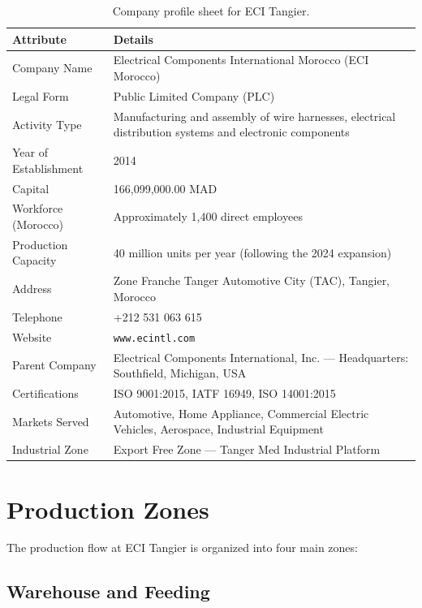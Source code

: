 \begin{table}[H]
  \centering
  \caption{Company profile sheet for ECI Tangier.}
  \label{tab:company-profile}
  \begin{tabular}{p{4cm} p{8cm}}
    \toprule
    \textbf{Attribute} & \textbf{Details} \\
    \midrule
    Company Name & Electrical Components International Morocco (ECI Morocco) \\
    Legal Form & Public Limited Company (PLC) \\
    Activity Type & Manufacturing and assembly of wire harnesses, electrical distribution systems and electronic components \\
    Year of Establishment & 2014 \\
    Capital & 166,099,000.00 MAD \\
    Workforce (Morocco) & Approximately 1,400 direct employees \\
    Production Capacity & 40 million units per year (following the 2024 expansion) \\
    Address & Zone Franche Tanger Automotive City (TAC), Tangier, Morocco \\
    Telephone & +212 531 063 615 \\
    Website & \texttt{www.ecintl.com} \\
    Parent Company & Electrical Components International, Inc. --- Headquarters: Southfield, Michigan, USA \\
    Certifications & ISO 9001:2015, IATF 16949, ISO 14001:2015 \\
    Markets Served & Automotive, Home Appliance, Commercial Electric Vehicles, Aerospace, Industrial Equipment \\
    Industrial Zone & Export Free Zone --- Tanger Med Industrial Platform \\
    \bottomrule
  \end{tabular}
\end{table}

\section{Production Zones}
\label{sec:production-zones}

The production flow at ECI Tangier is organized into four main zones:

\subsection{Warehouse and Feeding}

